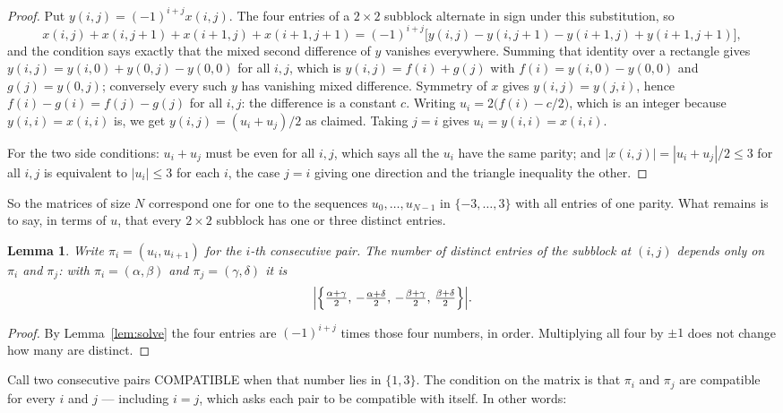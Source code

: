 \documentclass[11pt,a4paper]{article}
\theoremstyle{plain}
\newtheorem{lemma}[theorem]{Lemma}
\theoremstyle{definition}
\begin{document}
\begin{proof}
Put $y(i,j)=(-1)^{i+j}x(i,j)$. The four entries of a $2\times2$ subblock alternate in sign
under this substitution, so
\[
x(i,j)+x(i,j{+}1)+x(i{+}1,j)+x(i{+}1,j{+}1)
=(-1)^{i+j}\bigl[y(i,j)-y(i,j{+}1)-y(i{+}1,j)+y(i{+}1,j{+}1)\bigr],
\]
and the condition says exactly that the mixed second difference of $y$ vanishes everywhere.
Summing that identity over a rectangle gives
$y(i,j)=y(i,0)+y(0,j)-y(0,0)$ for all $i,j$, which is $y(i,j)=f(i)+g(j)$ with
$f(i)=y(i,0)-y(0,0)$ and $g(j)=y(0,j)$; conversely every such $y$ has vanishing mixed
difference. Symmetry of $x$ gives $y(i,j)=y(j,i)$, hence $f(i)-g(i)=f(j)-g(j)$ for all $i,j$:
the difference is a constant $c$. Writing $u_i=2\bigl(f(i)-c/2\bigr)$, which is an integer
because $y(i,i)=x(i,i)$ is, we get $y(i,j)=(u_i+u_j)/2$ as claimed. Taking $j=i$ gives
$u_i=y(i,i)=x(i,i)$.

For the two side conditions: $u_i+u_j$ must be even for all $i,j$, which says all the $u_i$ have
the same parity; and $|x(i,j)|=|u_i+u_j|/2\le3$ for all $i,j$ is equivalent to $|u_i|\le3$
for each $i$, the case $j=i$ giving one direction and the triangle inequality the other.
\end{proof}

So the matrices of size $N$ correspond one for one to the sequences $u_0,\dots,u_{N-1}$ in
$\{-3,\dots,3\}$ with all entries of one parity. What remains is to say, in terms of $u$,
that every $2\times2$ subblock has one or three distinct entries.

\begin{lemma}\label{lem:block}
Write $\pi_i=(u_i,u_{i+1})$ for the $i$-th consecutive pair. The number of distinct entries of
the subblock at $(i,j)$ depends only on $\pi_i$ and $\pi_j$: with $\pi_i=(\alpha,\beta)$ and
$\pi_j=(\gamma,\delta)$ it is
\[
\Bigl|\Bigl\{\tfrac{\alpha+\gamma}{2},\,-\tfrac{\alpha+\delta}{2},\,
-\tfrac{\beta+\gamma}{2},\,\tfrac{\beta+\delta}{2}\Bigr\}\Bigr| .
\]
\end{lemma}

\begin{proof}
By Lemma~\ref{lem:solve} the four entries are $(-1)^{i+j}$ times those four numbers, in
order. Multiplying all four by $\pm1$ does not change how many are distinct.
\end{proof}

Call two consecutive pairs COMPATIBLE when that number lies in $\{1,3\}$. The condition on the
matrix is that $\pi_i$ and $\pi_j$ are compatible for every $i$ and $j$ --- including $i=j$,
which asks each pair to be compatible with itself. In other words:
\end{document}

